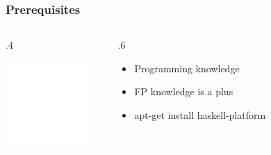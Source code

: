 \documentclass[17pt]{beamer}
\renewcommand{\(}[1]{\begin{columns}[#1]}
\renewcommand{\)}{\end{columns}}
\newcommand{\<}[1]{\begin{column}{#1}}
\renewcommand{\>}{\end{column}}
\begin{document}
\begin{frame}
  \frametitle{Prerequisites}
  \({c}
  \<{.4\textwidth}
  \begin{center}
    \includegraphics[width=0.9\textwidth]{img/replace_me_with_anything_you_want}
  \end{center}
  \>
  \<{.6\textwidth}
  \begin{center}
  \begin{itemize}
    \item Programming knowledge
    \item FP knowledge is a plus
    \item apt-get install haskell-platform
  \end{itemize}
  \end{center}
  \>
  \)
\end{frame}
\end{document}
